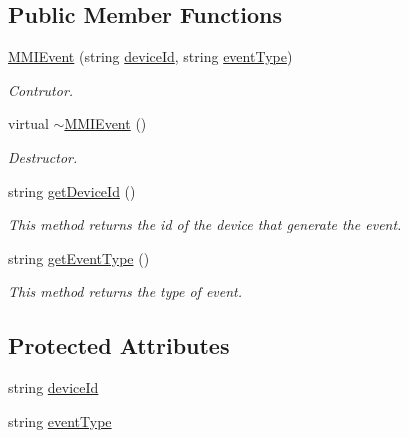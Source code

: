 \subsection*{Public Member Functions}
\begin{DoxyCompactItemize}
\item 
\hyperlink{classbr_1_1ufscar_1_1lince_1_1mmi_1_1MMIEvent_ad2930762ec9b524bfe2824b2acc3b655}{MMIEvent} (string \hyperlink{classbr_1_1ufscar_1_1lince_1_1mmi_1_1MMIEvent_ab49d18c433659ed8e7dbdaa9004839d5}{deviceId}, string \hyperlink{classbr_1_1ufscar_1_1lince_1_1mmi_1_1MMIEvent_af26d77edf2187a0536c4365a3aaaf531}{eventType})
\begin{DoxyCompactList}\small\item\em Contrutor. \item\end{DoxyCompactList}\item 
virtual \hyperlink{classbr_1_1ufscar_1_1lince_1_1mmi_1_1MMIEvent_a657edd3701e56a3ab7901bcbe3f492ad}{$\sim$MMIEvent} ()
\begin{DoxyCompactList}\small\item\em Destructor. \item\end{DoxyCompactList}\item 
string \hyperlink{classbr_1_1ufscar_1_1lince_1_1mmi_1_1MMIEvent_a3bef1a44ba5335235b90dd89450d2b5c}{getDeviceId} ()
\begin{DoxyCompactList}\small\item\em This method returns the id of the device that generate the event. \item\end{DoxyCompactList}\item 
string \hyperlink{classbr_1_1ufscar_1_1lince_1_1mmi_1_1MMIEvent_a57aeaad0d4209139079bbc1314818c6a}{getEventType} ()
\begin{DoxyCompactList}\small\item\em This method returns the type of event. \item\end{DoxyCompactList}\end{DoxyCompactItemize}
\subsection*{Protected Attributes}
\begin{DoxyCompactItemize}
\item 
string \hyperlink{classbr_1_1ufscar_1_1lince_1_1mmi_1_1MMIEvent_ab49d18c433659ed8e7dbdaa9004839d5}{deviceId}
\item 
string \hyperlink{classbr_1_1ufscar_1_1lince_1_1mmi_1_1MMIEvent_af26d77edf2187a0536c4365a3aaaf531}{eventType}
\end{DoxyCompactItemize}


